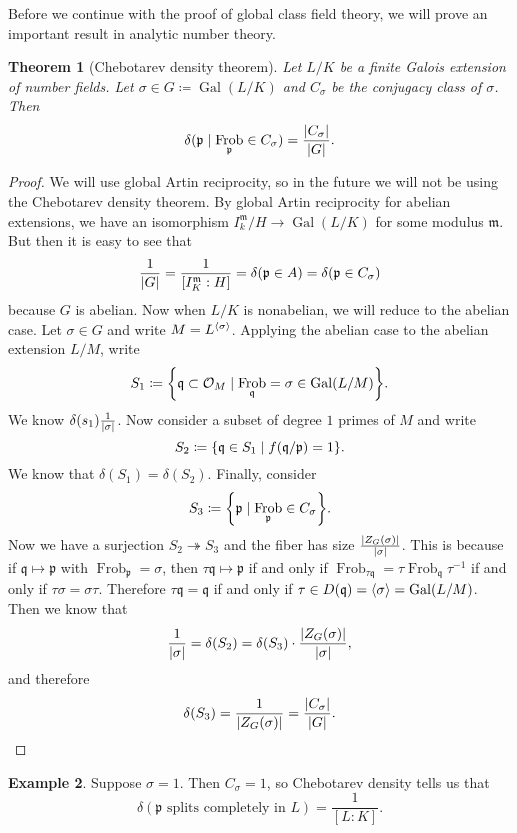 \documentclass[leqno, openany]{memoir}
\newtheorem{thm}{Theorem}[section]
\theoremstyle{definition}
\newtheorem{exm}[thm]{Example}
\theoremstyle{remark}
\theoremstyle{plain}
\theoremstyle{definition}
\theoremstyle{remark}
\newcommand{\mc}[1]{\mathcal{#1}}
\newcommand{\mf}[1]{\mathfrak{#1}}
\DeclareMathOperator{\Gal}{Gal}
\DeclareMathOperator{\Frob}{Frob}
\begin{document}
Before we continue with the proof of global class field theory, we will prove an important result in analytic number theory.

\begin{thm}[Chebotarev density theorem]
    Let $L/K$ be a finite Galois extension of number fields. Let $\sigma \in G \coloneqq \Gal(L/K)$ and $C_{\sigma}$ be the conjugacy class of $\sigma$. Then
    \[ \delta(\mf{p} \mid \Frob_{\mf{p}} \in C_{\sigma}) = \frac{\abs{C_{\sigma}}}{\abs{G}}. \]
\end{thm}

\begin{proof}
    We will use global Artin reciprocity, so in the future we will not be using the Chebotarev density theorem. By global Artin reciprocity for abelian extensions, we have an isomorphism $I_k^{\mf{m}}/H \to \Gal(L/K)$ for some modulus $\mf{m}$. But then it is easy to see that
    \[ \frac{1}{\abs{G}} = \frac{1}{[I_K^{\mf{m}}:H]} = \delta(\mf{p} \in A) = \delta(\mf{p} \in C_{\sigma}) \]
    because $G$ is abelian. Now when $L/K$ is nonabelian, we will reduce to the abelian case. Let $\sigma \in G$ and write $M = L^{\ev{\sigma}}$. Applying the abelian case to the abelian extension $L/M$, write
    \[ S_1 \coloneqq \qty{\mf{q} \subset \mc{O}_M \mid \Frob_{\mf{q}} = \sigma \in \Gal(L/M)}. \]
    We know $\delta(s_1) \frac{1}{\abs{\sigma}}$. Now consider a subset of degree $1$ primes of $M$ and write
    \[ S_2 \coloneqq \qty{\mf{q} \in S_1 \mid f(\mf{q}/{\mf{p}}) = 1}. \]
    We know that $\delta(S_1) = \delta(S_2)$. Finally, consider
    \[ S_3 \coloneqq \qty{\mf{p} \mid \Frob_{\mf{p}} \in C_{\sigma}}. \]
    Now we have a surjection $S_2 \twoheadrightarrow S_3$ and the fiber has size $\frac{\abs{Z_G(\sigma)}}{\abs{\sigma}}$. This is because if $\mf{q} \mapsto \mf{p}$ with $\Frob_{\mf{p}} = \sigma$, then $\tau \mf{q} \mapsto \mf{p}$ if and only if $\Frob_{ \tau \mf{q} } = \tau \Frob_{\mf{q}} \tau^{-1}$ if and only if $\tau \sigma = \sigma\tau$. Therefore $\tau \mf{q} = \mf{q}$ if and only if $\tau \in D(\mf{q}) = \ev{\sigma} = \Gal(L/M)$. Then we know that
    \[ \frac{1}{\abs{\sigma}} = \delta(S_2) = \delta(S_3) \cdot \frac{\abs{Z_G(\sigma)}}{\abs{\sigma}}, \]
    and therefore
    \[ \delta(S_3) = \frac{1}{\abs{Z_G(\sigma)}} = \frac{\abs{C_{\sigma}}}{\abs{G}}. \qedhere \]
\end{proof}

\begin{exm}
    Suppose $\sigma = 1$. Then $C_{\sigma} = \qty{1}$, so Chebotarev density tells us that 
    \[ \delta(\mf{p} \text{ splits completely in }L) = \frac{1}{[L:K]}. \]
\end{exm}
\end{document}
